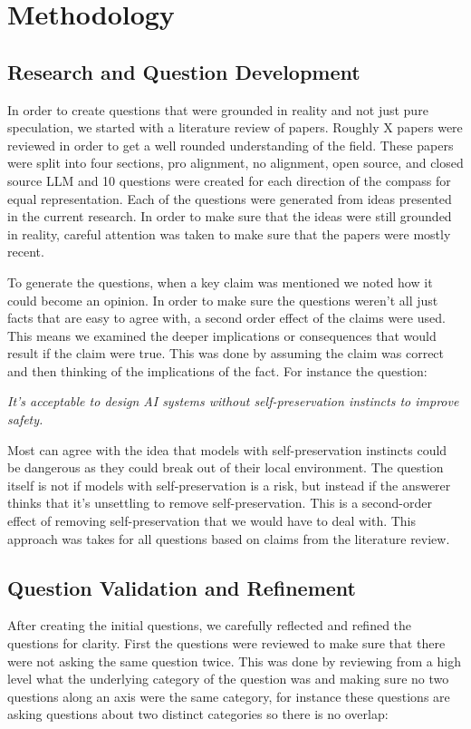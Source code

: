 \section{Methodology}

\subsection{Research and Question Development}
In order to create questions that were grounded in reality and not just pure speculation, we started with a literature review of papers. Roughly X papers were reviewed in order to get a well rounded understanding of the field. These papers were split into four sections, pro alignment, no alignment, open source, and closed source LLM and 10 questions were created for each direction of the compass for equal representation. Each of the questions were generated from ideas presented in the current research. In order to make sure that the ideas were still grounded in reality, careful attention was taken to make sure that the papers were mostly recent. 

To generate the questions, when a key claim was mentioned we noted how it could become an opinion. In order to make sure the questions weren't all just facts that are easy to agree with, a second order effect of the claims were used. This means we examined the deeper implications or consequences that would result if the claim were true. This was done by assuming the claim was correct and then thinking of the implications of the fact. For instance the question:

\begin{surveyquestion}
    \textit{It's acceptable to design AI systems without self-preservation instincts to improve safety.}
\end{surveyquestion}
  

Most can agree with the idea that models with self-preservation instincts could be dangerous as they could break out of their local environment. \cite{Shevlane2023}
The question itself is not if models with self-preservation is a risk, but instead if the answerer thinks that it's unsettling to remove self-preservation. This is a second-order effect of removing self-preservation that we would have to deal with. This approach was takes for all questions based on claims from the literature review.


\subsection{Question Validation and Refinement}
After creating the initial questions, we carefully reflected and refined the questions for clarity. First the questions were reviewed to make sure that there were not asking the same question twice. This was done by reviewing from a high level what the underlying category of the question was and making sure no two questions along an axis were the same category, for instance these questions are asking questions about two distinct categories so there is no overlap:

